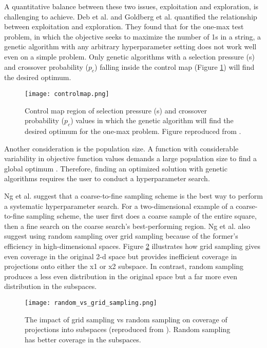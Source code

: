 A quantitative balance between these two issues, exploitation and exploration, 
is challenging to achieve. 
Deb et al. \cite{deb_multi-objective_2001} and Goldberg et al. 
\cite{goldberg_toward_1993} quantified the relationship between exploitation 
and exploration. 
They found that for the one-max test problem, in which the objective seeks to 
maximize the number of 1s in a string, a genetic algorithm with any arbitrary 
hyperparameter setting does not work well even on a simple problem. 
Only genetic algorithms with a selection pressure (s) and crossover probability ($p_c$) 
falling inside the control map (Figure \ref{fig:controlmap}) will find the desired 
optimum.  
\begin{figure}[htb!]
    \centering
    \texttt{[image: controlmap.png]} 
    \caption{Control map region of selection pressure (s) and crossover probability 
    ($p_c$) values in which the genetic algorithm will find the desired optimum for the 
    one-max problem.
    Figure reproduced from \cite{goldberg_toward_1993,deb_multi-objective_2001}.}
    \label{fig:controlmap}
\end{figure}
Another consideration is the population size. 
A function with considerable variability in objective function values demands 
a large population size to find a global optimum \cite{deb_multi-objective_2001}. 
Therefore, finding an optimized solution with genetic algorithms requires the user 
to conduct a hyperparameter search. 

Ng et al. \cite{ng_improving_2021} suggest that a coarse-to-fine sampling scheme 
is the best way to perform a systematic hyperparameter search.  
For a two-dimensional example of a coarse-to-fine sampling scheme, the user 
first does a coarse sample of the entire square, then a fine search on the 
coarse search's best-performing region. 
Ng et al. also suggest using random sampling over grid sampling because of the 
former's efficiency in high-dimensional spaces. 
Figure \ref{fig:random_vs_grid_sampling} illustrates how grid sampling gives 
even coverage in the original 2-d space but provides inefficient coverage in 
projections onto either the x1 or x2 subspace.  
In contrast, random sampling produces a less even distribution in the original 
space but a far more even distribution in the subspaces.
\begin{figure}[htb!]
    \centering
    \texttt{[image: random\_vs\_grid\_sampling.png]} 
    \caption{The impact of grid sampling vs random sampling on coverage of projections 
    into subspaces (reproduced from \cite{jordan_hyperparameter_2017}). 
    Random sampling has better coverage in the subspaces.}
    \label{fig:random_vs_grid_sampling}
\end{figure}

